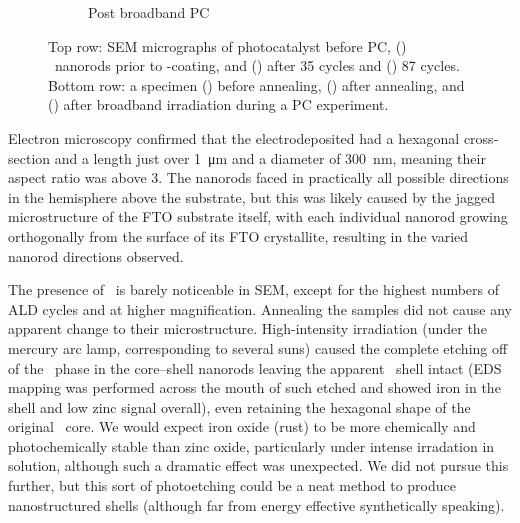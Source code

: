 \documentclass[draft,webedition,openright,titles,swedish,english]{LuaUUThesis}\usepackage[]{graphicx}\usepackage[]{xcolor}
\begin{document}
\begin{figure}[tbp]
\begin{subfigure}[b]{0.31\textwidth}
\caption{Post broadband PC}
\label{fig:SEM-post-broadbandPC}
\end{subfigure}%
\caption[SEM micrographs / nanorods]{%
  Top row: \protect\gls{SEM} micrographs of photocatalyst before \protect\gls{PC},
  () \ZnO\ nanorods prior to \ironox-coating, and
  () after 35 cycles and
  () 87 cycles.
  Bottom row: a specimen
  () before annealing,
  () after annealing, and
  () after broadband irradiation during a \protect\gls{PC} experiment.
}
\label{fig:SEM-87-all-steps}
\end{figure}

Electron microscopy confirmed that the electrodeposited 
had a hexagonal cross-section and a length just over \qty{1}{\um} and a diameter
of \qty{300}{\nm}, meaning their aspect ratio was above \num{3}.
The nanorods faced in practically all possible directions in the hemisphere above
the substrate, but this was likely caused by the jagged microstructure of the
\gls{FTO} substrate itself, with each individual nanorod growing orthogonally
from the surface of its \gls{FTO} crystallite, resulting in the varied nanorod
directions observed.

The presence of \ironox\ is barely noticeable in \gls{SEM}, except for the highest
numbers of \gls{ALD} cycles and at higher magnification.
Annealing the samples did not cause any apparent change to their microstructure.
High-intensity irradiation (under the mercury arc lamp, corresponding to several suns)
caused the complete etching off of the \ZnO\ phase in the
core--shell nanorods leaving the apparent \ironox\ shell intact
(\gls{EDS} mapping was performed across the mouth of such etched 
and showed iron in the shell and low zinc signal overall),
even retaining the hexagonal shape of the original \ZnO\ core.
We would expect iron oxide (rust) to be more chemically and photochemically stable
than zinc oxide, particularly under intense irradation in solution, although
such a dramatic effect was unexpected.
We did not pursue this further, but this sort of photoetching could be a neat
method to produce nanostructured shells (although far from energy effective
synthetically speaking).



%

\end{document}
